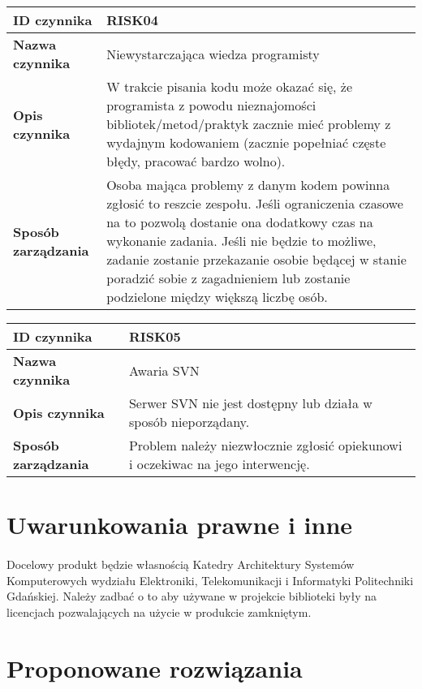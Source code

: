 \documentclass[a4paper,10pt]{article}
\begin{document}
\begin{center}
\begin{tabular}{|l|p{12cm}|}
\hline
\textbf{ID czynnika} &  RISK04 \tabularnewline \hline
\textbf{Nazwa czynnika} & Niewystarczająca wiedza programisty \tabularnewline \hline
\textbf{Opis czynnika} & W trakcie pisania kodu może okazać się, że programista z powodu nieznajomości bibliotek/metod/praktyk zacznie mieć problemy z wydajnym kodowaniem (zacznie popełniać częste błędy, pracować bardzo wolno).  \tabularnewline \hline
\textbf{Sposób zarządzania} & Osoba mająca problemy z danym kodem powinna zgłosić to reszcie zespołu. Jeśli ograniczenia czasowe na to pozwolą dostanie ona dodatkowy czas na wykonanie zadania. Jeśli nie będzie to możliwe, zadanie zostanie przekazanie osobie będącej w stanie poradzić sobie z zagadnieniem lub zostanie podzielone między większą liczbę osób. \tabularnewline \hline
\end{tabular}
\end{center}

\begin{center}
\begin{tabular}{|l|p{12cm}|}
\hline
\textbf{ID czynnika} &  RISK05 \tabularnewline \hline
\textbf{Nazwa czynnika} & Awaria SVN \tabularnewline \hline
\textbf{Opis czynnika} & Serwer SVN nie jest dostępny lub działa w sposób nieporządany. \tabularnewline \hline
\textbf{Sposób zarządzania} & Problem należy niezwłocznie zgłosić opiekunowi i oczekiwac na jego interwencję. \tabularnewline \hline
\end{tabular}
\end{center}



\section{Uwarunkowania prawne i inne}
\paragraph{} Docelowy produkt będzie własnością Katedry Architektury Systemów Komputerowych wydziału Elektroniki, Telekomunikacji i Informatyki Politechniki Gdańskiej.  Należy zadbać  o to aby używane w projekcie biblioteki były na licencjach pozwalających na użycie w produkcie zamkniętym. 


\section{Proponowane rozwiązania}
\end{document}
